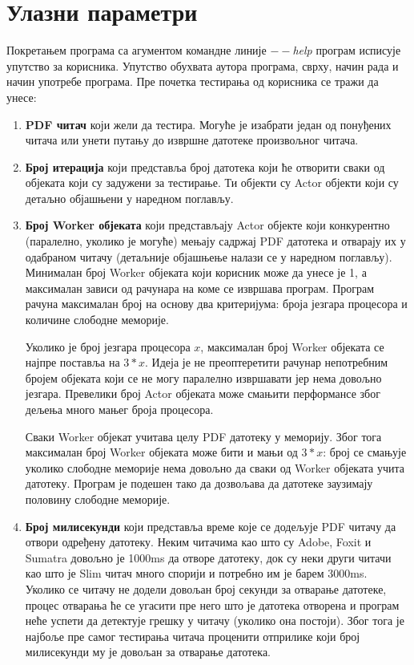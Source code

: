 \documentclass[12pt,oneside]{memoir}
\begin{document}
\section{Улазни параметри}
\label{sec:ulazniParametri}

Покретањем програма са агументом командне линије \textit{$--$help} програм исписује упутство за корисника. Упутство обухвата аутора програма, сврху, начин рада и начин употребе програма. Пре почетка тестирања од корисника се тражи да унесе:
\begin{enumerate}
\item{\textbf{PDF читач}} који жели да тестира. Могуће је изабрати један од понуђених читача или унети путању до извршне датотеке произвољног читача.
\item{\textbf{Број итерација}} који представља број датотека који ће отворити сваки од објеката који су задужени за тестирање. Ти објекти су Actor објекти  који су детаљно објашњени у наредном поглављу. %
\item{\textbf{Број Worker објеката}} који представљају Actor објекте који конкурентно (паралелно, уколико је могуће) мењају садржај PDF датотека и отварају их у одабраном читачу (детаљније објашњење налази се у наредном поглављу). Минималан број Worker објеката који корисник може да унесе је 1, а максималан зависи од рачунара на коме се извршава програм. Програм рачуна максималан број на основу два критеријума: броја језгара процесора и количине слободне меморије.

Уколико је број језгара процесора $x$, максималан број Worker објеката се најпре поставља на $3*x$. Идеја је не преоптеретити рачунар непотребним бројем објеката који се не могу паралелно извршавати јер нема довољно језгара. Превелики број Actor објеката може смањити перформансе због дељења много мањег броја процесора.

Сваки Worker објекат учитава целу PDF датотеку у меморију. Због тога максималан број Worker објеката може бити и мањи од $3*x$: број се смањује уколико слободне меморије нема довољно да сваки од Worker објеката учита датотеку. Програм је подешен тако да дозвољава да датотеке заузимају половину слободне меморије.
\item{\textbf{Број милисекунди}} који представља време које се додељује PDF читачу да отвори одређену датотеку. Неким читачима као што су Adobe, Foxit и Sumatra довољно је 1000ms да отворе датотеку, док су неки други читачи као што је Slim читач много спорији и потребно им је барем 3000ms. Уколико се читачу не додели довољан број секунди за отварање датотеке, процес отварања ће се угасити пре него што је датотека отворена и програм неће успети да детектује грешку у читачу (уколико она постоји). Због тога је најбоље пре самог тестирања читача проценити отприлике који број милисекунди му је довољан за отварање датотека.
\end{enumerate}
\end{document}
